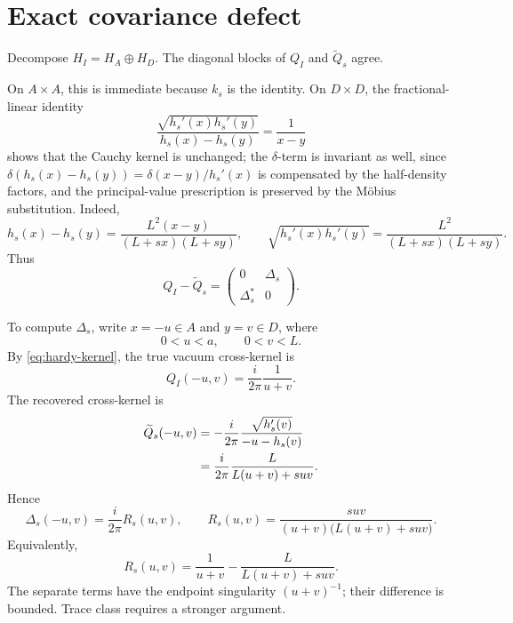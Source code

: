 \documentclass[11pt]{article}
\theoremstyle{accent}
\theoremstyle{definition}
\begin{document}
\section{Exact covariance defect}

Decompose \(H_I=H_A\oplus H_D\).  The diagonal blocks of \(Q_I\) and \(\widetilde Q_s\) agree.

On \(A\times A\), this is immediate because \(k_s\) is the identity.  On \(D\times D\), the fractional-linear identity
\begin{equation}\label{eq:mobius-cauchy}
 \frac{\sqrt{h_s'(x)h_s'(y)}}{h_s(x)-h_s(y)}=\frac1{x-y}
\end{equation}
shows that the Cauchy kernel is unchanged; the \(\delta\)-term is invariant as well, since \(\delta(h_s(x)-h_s(y))=\delta(x-y)/h_s'(x)\) is compensated by the half-density factors, and the principal-value prescription is preserved by the M\"obius substitution.  Indeed,
\[
 h_s(x)-h_s(y)=\frac{L^2(x-y)}{(L+sx)(L+sy)},
 \qquad
 \sqrt{h_s'(x)h_s'(y)}=\frac{L^2}{(L+sx)(L+sy)}.
\]
Thus
\begin{equation}\label{eq:block-form}
 Q_I-\widetilde Q_s
 =\begin{pmatrix}
 0&\Delta_s\\
 \Delta_s^*&0
 \end{pmatrix}.
\end{equation}

To compute \(\Delta_s\), write \(x=-u\in A\) and \(y=v\in D\), where
\[
 0<u<a,\qquad0<v<L.
\]
By \eqref{eq:hardy-kernel}, the true vacuum cross-kernel is
\begin{equation}\label{eq:true-cross}
 Q_I(-u,v)=\frac{i}{2\pi}\frac1{u+v}.
\end{equation}
The recovered cross-kernel is
\begin{align}
 \widetilde Q_s(-u,v)
 &=-\frac{i}{2\pi}
 \frac{\sqrt{h_s'(v)}}{-u-h_s(v)}\notag\\
 &=\frac{i}{2\pi}
 \frac{L}{L(u+v)+suv}.
 \label{eq:recovered-cross}
\end{align}
Hence
\begin{equation}\label{eq:delta-kernel}
 \boxed{
 \Delta_s(-u,v)=\frac{i}{2\pi}R_s(u,v),
 \qquad
 R_s(u,v)=
 \frac{suv}{(u+v)\bigl(L(u+v)+suv\bigr)}.
 }
\end{equation}
Equivalently,
\begin{equation}\label{eq:R-difference}
 R_s(u,v)=\frac1{u+v}
 -\frac{L}{L(u+v)+suv}.
\end{equation}
The separate terms have the endpoint singularity \((u+v)^{-1}\); their difference is bounded.  Trace class requires a stronger argument.
\end{document}
